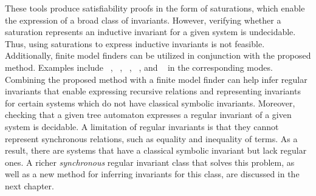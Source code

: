 These tools produce satisfiability proofs in the form of saturations, which enable the expression of a broad class of invariants. However, verifying whether a saturation represents an inductive invariant for a given system is undecidable. Thus, using saturations to express inductive invariants is not feasible.
Additionally, finite model finders can be utilized in conjunction with the proposed method. Examples include \mace{}~\cite{https://doi.org/10.48550/arxiv.cs/0310055}, \kodkod{}~\cite {10.1007/978-3-540-71209-1_49}, \paradox{}~\cite{claessen2003new},  \cvc{}~\cite{reynolds2013finite}, and \vampire{}~\cite{10.1007/978-3-319-40970-2_20} in the corresponding modes. Combining the proposed method with a finite model finder can help infer regular invariants that enable expressing recursive relations and representing invariants for certain systems which do not have classical symbolic invariants. Moreover, checking that a given tree automaton expresses a regular invariant of a given system is decidable.
A limitation of regular invariants is that they cannot represent synchronous relations, such as equality and inequality of terms. As a result, there are systems that have a classical symbolic invariant but lack regular ones.
A richer \emph{synchronous} regular invariant class that solves this problem, as well as a new method for inferring invariants for this class, are discussed in the next chapter.
